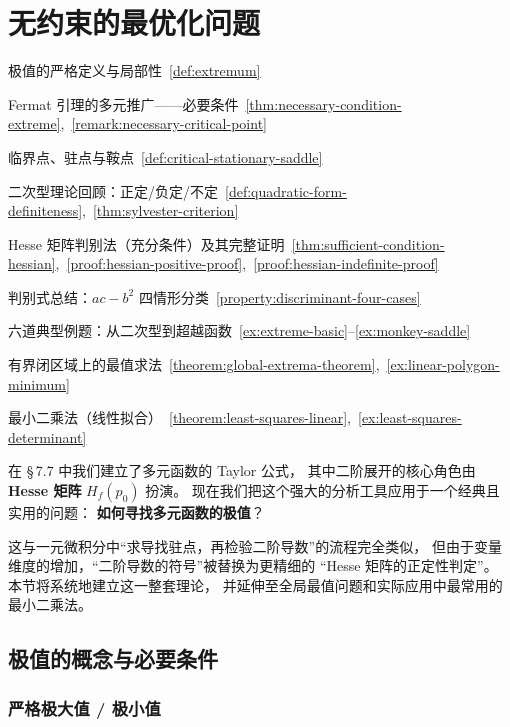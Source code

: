 \documentclass[lang=cn,11pt]{elegantbook}
\begin{document}
\section{无约束的最优化问题}

\begin{introduction}
  \item 极值的严格定义与局部性~\ref{def:extremum}
  \item Fermat 引理的多元推广——必要条件~\ref{thm:necessary-condition-extreme},~\ref{remark:necessary-critical-point}
  \item 临界点、驻点与鞍点~\ref{def:critical-stationary-saddle}
  \item 二次型理论回顾：正定/负定/不定~\ref{def:quadratic-form-definiteness},~\ref{thm:sylvester-criterion}
  \item Hesse 矩阵判别法（充分条件）及其完整证明~\ref{thm:sufficient-condition-hessian},~\ref{proof:hessian-positive-proof},~\ref{proof:hessian-indefinite-proof}
  \item 判别式总结：$ac-b^2$ 四情形分类~\ref{property:discriminant-four-cases}
  \item 六道典型例题：从二次型到超越函数~\ref{ex:extreme-basic}--\ref{ex:monkey-saddle}
  \item 有界闭区域上的最值求法~\ref{theorem:global-extrema-theorem},~\ref{ex:linear-polygon-minimum}
  \item 最小二乘法（线性拟合）~\ref{theorem:least-squares-linear},~\ref{ex:least-squares-determinant}
\end{introduction}

在 \S\,7.7 中我们建立了多元函数的 Taylor 公式，
其中二阶展开的核心角色由 \textbf{Hesse 矩阵} $H_f(p_0)$ 扮演。
现在我们把这个强大的分析工具应用于一个经典且实用的问题：
\textbf{如何寻找多元函数的极值}？

这与一元微积分中“求导找驻点，再检验二阶导数”的流程完全类似，
但由于变量维度的增加，“二阶导数的符号”被替换为更精细的
“Hesse 矩阵的正定性判定”。
本节将系统地建立这一整套理论，
并延伸至全局最值问题和实际应用中最常用的最小二乘法。


\subsection{极值的概念与必要条件}

\subsubsection*{严格极大值 / 极小值}
\end{document}
